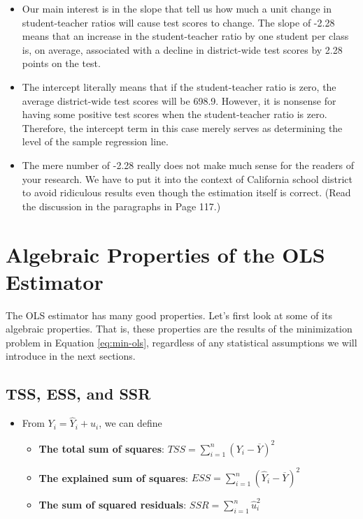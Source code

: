 \documentclass[a4paper,11pt]{article}
\begin{document}
\begin{itemize}
\item Our main interest is in the slope that tell us how much a unit
change in student-teacher ratios will cause test scores to
change. The slope of -2.28 means that an increase in the
student-teacher ratio by one student per class is, on average,
associated with a decline in district-wide test scores by 2.28
points on the test.
\item The intercept literally means that if the student-teacher ratio is
zero, the average district-wide test scores will be 698.9. However,
it is nonsense for having some positive test scores when the
student-teacher ratio is zero. Therefore, the intercept term in this
case merely serves as determining the level of the sample regression
line.
\item The mere number of -2.28 really does not make much sense for the
readers of your research. We have to put it into the context of
California school district to avoid ridiculous results even though
the estimation itself is correct. (Read the discussion in the
paragraphs in Page 117.)
\end{itemize}


\section{Algebraic Properties of the OLS Estimator}
\label{sec:org546d06b}

The OLS estimator has many good properties. Let's first look at some
of its algebraic properties. That is, these properties are the results
of the minimization problem in Equation \eqref{eq:min-ols}, regardless of any
statistical assumptions we will introduce in the next sections.

\subsection{TSS, ESS, and SSR}
\label{sec:orge150aee}

\begin{itemize}
\item From \(Y_i = \hat{Y}_i + \hat{u}_i\), we can define
\begin{itemize}
\item \textbf{The total sum of squares}: \(TSS = \sum_{i=1}^n (Y_i - \overline{Y})^2\)
\item \textbf{The explained sum of squares}: \(ESS = \sum_{i=1}^n (\hat{Y}_i - \overline{Y})^2\)
\item \textbf{The sum of squared residuals}: \(SSR = \sum_{i=1}^n \hat{u}_i^2\)
\end{itemize}
\end{itemize}
\end{document}
